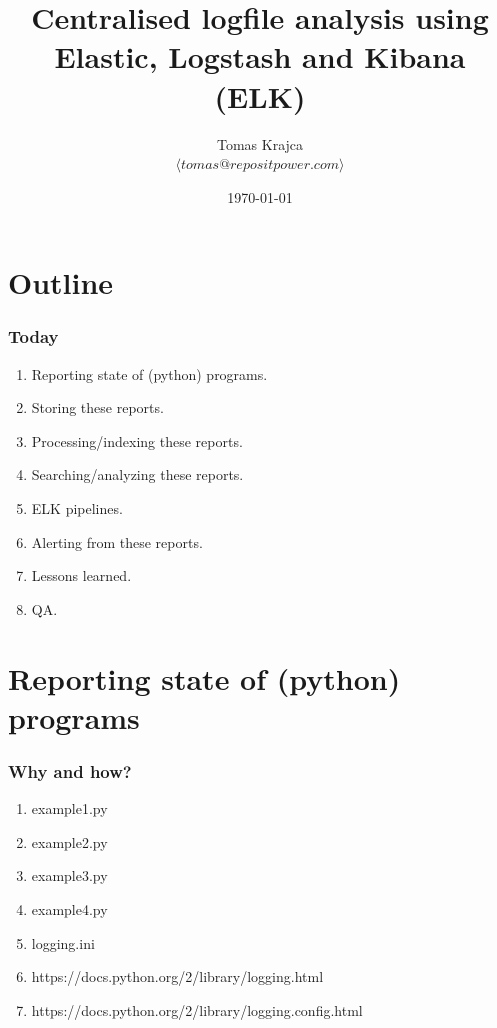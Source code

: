 \documentclass[13pt, ignorenonframetext]{beamer}
\institute[PUG@Canberra]{PUG Meetup   \\
Canberra}
\title[Centralised logfile analysis using ELK]{Centralised logfile analysis using Elastic, Logstash and Kibana (ELK)}
\author[Tomas Krajca]{Tomas Krajca \\{\tiny $\langle tomas@repositpower.com \rangle$}}
\date{\today}
\begin{document}
\begin{frame}[plain]
	\titlepage
\end{frame}


\section{Outline}
\frame
{
  \frametitle{Today}
  \begin{enumerate}
  \item Reporting state of (python) programs.
  \item Storing these reports.
  \item Processing/indexing these reports.
  \item Searching/analyzing these reports.
  \item ELK pipelines.
  \item Alerting from these reports.
  \item Lessons learned.
  \item QA.
  \end{enumerate}
}

\section{Reporting state of (python) programs}
\begin{frame}
\frametitle{Why and how?}
\begin{enumerate}
\item example1.py
\item example2.py
\item example3.py
\item example4.py
\item logging.ini
\item https://docs.python.org/2/library/logging.html
\item https://docs.python.org/2/library/logging.config.html
\end{enumerate}
\end{frame}
\end{document}

